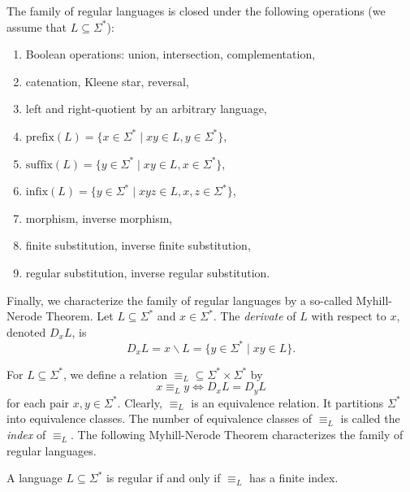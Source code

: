 \begin{theorem}
The family of regular languages is closed under the following operations (we assume that $L \subseteq \Sigma^*$):
\begin{enumerate}
\item Boolean operations: union, intersection, complementation,
\item catenation, Kleene star, reversal,
\item left and right-quotient by an arbitrary language,
\item $\text{prefix}(L) = \{x \in \Sigma^* \mid xy \in L, y \in \Sigma^*\}$,
\item $\text{suffix}(L) = \{y \in \Sigma^* \mid xy \in L, x \in \Sigma^*\}$,
\item $\text{infix}(L) = \{y \in \Sigma^* \mid xyz \in L, x,z \in \Sigma^*\}$,
\item morphism, inverse morphism,
\item finite substitution, inverse finite substitution,
\item regular substitution, inverse regular substitution.
\end{enumerate}
\end{theorem}

Finally, we characterize the family of regular languages by a so-called Myhill-Nerode Theorem. Let $L \subseteq \Sigma^*$ and $x \in \Sigma^*$. The \emph{derivate} of $L$ with respect to $x$, denoted $D_x L$, is $$D_x L = x \backslash L = \{y \in \Sigma^* \mid xy \in L\}.$$

For $L \subseteq \Sigma^*$, we define a relation $\equiv_L \subseteq \Sigma^* \times \Sigma^*$ by $$x \equiv_L y \Leftrightarrow D_x L = D_y L$$ for each pair $x, y \in \Sigma^*$. Clearly, $\equiv_L$ is an equivalence relation. It partitions $\Sigma^*$ into equivalence classes. The number of equivalence classes of $\equiv_L$ is called the \emph{index} of $\equiv_L$. 
The following Myhill-Nerode Theorem characterizes the family of regular languages.

\begin{theorem}
A language $L \subseteq \Sigma^*$ is regular if and only if $\equiv_L$ has a finite index.
\end{theorem}

